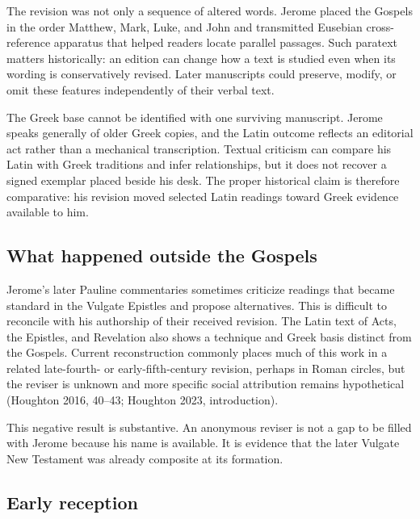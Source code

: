 The revision was not only a sequence of altered words. Jerome placed the Gospels in the order Matthew, Mark, Luke, and John and transmitted Eusebian cross-reference apparatus that helped readers locate parallel passages. Such paratext matters historically: an edition can change how a text is studied even when its wording is conservatively revised. Later manuscripts could preserve, modify, or omit these features independently of their verbal text.

The Greek base cannot be identified with one surviving manuscript. Jerome speaks generally of older Greek copies, and the Latin outcome reflects an editorial act rather than a mechanical transcription. Textual criticism can compare his Latin with Greek traditions and infer relationships, but it does not recover a signed exemplar placed beside his desk. The proper historical claim is therefore comparative: his revision moved selected Latin readings toward Greek evidence available to him.

\subsection{What happened outside the Gospels}

Jerome's later Pauline commentaries sometimes criticize readings that became standard in the Vulgate Epistles and propose alternatives. This is difficult to reconcile with his authorship of their received revision. The Latin text of Acts, the Epistles, and Revelation also shows a technique and Greek basis distinct from the Gospels. Current reconstruction commonly places much of this work in a related late-fourth- or early-fifth-century revision, perhaps in Roman circles, but the reviser is unknown and more specific social attribution remains hypothetical (Houghton 2016, 40--43; Houghton 2023, introduction).

This negative result is substantive. An anonymous reviser is not a gap to be filled with Jerome because his name is available. It is evidence that the later Vulgate New Testament was already composite at its formation.


\subsection{Early reception}

